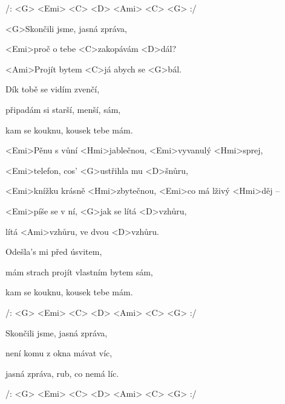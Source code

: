 

/: <G> <Emi> <C> <D> <Ami> <C> <G> :/

\zs
<G>Skončili jsme, jasná zpráva,

<Emi>proč o tebe <C>zakopávám <D>dál?

<Ami>Projít bytem <C>já abych se <G>bál.
\ks

\zs
Dík tobě se vidím zvenčí,

připadám si starší, menší, sám,

kam se kouknu, kousek tebe mám.
\ks

\zr
<Emi>Pěnu s vůní <Hmi>jablečnou, <Emi>vyvanulý <Hmi>sprej,

<Emi>telefon, cos' <G>ustřihla mu <D>šnůru,

<Emi>knížku krásně <Hmi>zbytečnou, <Emi>co má lživý <Hmi>děj --

<Emi>píše se v ní, <G>jak se lítá <D>vzhůru,

lítá <Ami>vzhůru, ve dvou <D>vzhůru.
\kr

\zs
Odešla's mi před úsvitem,

mám strach projít vlastním bytem sám,

kam se kouknu, kousek tebe mám.
\ks

/: <G> <Emi> <C> <D> <Ami> <C> <G> :/

\zr\kr

\zs
Skončili jsme, jasná zpráva,

není komu z okna mávat víc,

jasná zpráva, rub, co nemá líc.
\ks

/: <G> <Emi> <C> <D> <Ami> <C> <G> :/

\kp
